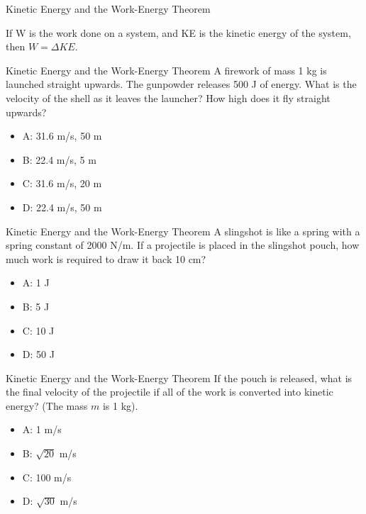 \documentclass{beamer}
\begin{document}
\begin{frame}{Kinetic Energy and the Work-Energy Theorem}
\begin{tcolorbox}[colback=white,colframe=red!40!blue,title=The Work-Energy Theorem]
\alert{If W is the work done on a system, and KE is the kinetic energy of the system, then $W = \Delta KE$.}
\end{tcolorbox}
\end{frame}

\begin{frame}{Kinetic Energy and the Work-Energy Theorem}
A firework of mass 1 kg is launched straight upwards.  The gunpowder releases 500 J of energy.  What is the velocity of the shell as it leaves the launcher?  How high does it fly straight upwards?
\begin{itemize}
\item A: 31.6 m/s, 50 m
\item B: 22.4 m/s, 5 m
\item C: 31.6 m/s, 20 m
\item D: 22.4 m/s, 50 m
\end{itemize}
\end{frame}

\begin{frame}{Kinetic Energy and the Work-Energy Theorem}
A slingshot is like a spring with a spring constant of 2000 N/m.  If a projectile is placed in the slingshot pouch, how much work is required to draw it back 10 cm?
\begin{itemize}
\item A: 1 J
\item B: 5 J
\item C: 10 J
\item D: 50 J
\end{itemize}
\end{frame}

\begin{frame}{Kinetic Energy and the Work-Energy Theorem}
If the pouch is released, what is the final velocity of the projectile if all of the work is converted into kinetic energy? (The mass $m$ is 1 kg).
\begin{itemize}
\item A: 1 m/s
\item B: $\sqrt{20}$ m/s
\item C: 100 m/s
\item D: $\sqrt{30}$ m/s
\end{itemize}
\end{frame}
\end{document}
